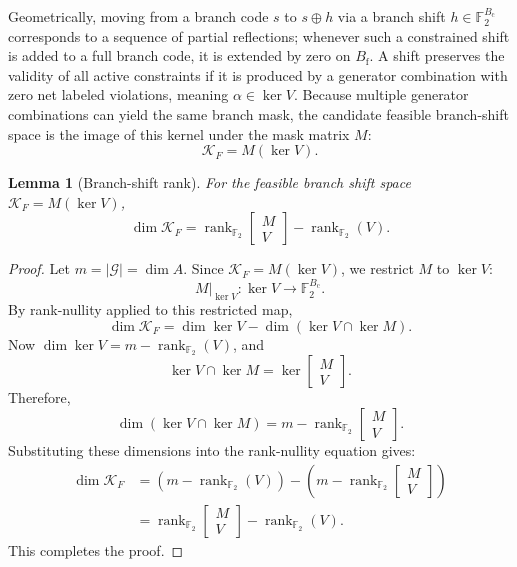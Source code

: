 \documentclass[11pt]{article}
\theoremstyle{plain}
\newtheorem{lemma}{Lemma}
\theoremstyle{definition}
\begin{document}
Geometrically, moving from a branch code $s$ to $s \oplus h$ via a branch shift $h \in \mathbb{F}_2^{B_{\mathrm{c}}}$ corresponds to a sequence of partial reflections; whenever such a constrained shift is added to a full branch code, it is extended by zero on $B_{\mathrm{f}}$. A shift preserves the validity of all active constraints if it is produced by a generator combination with zero net labeled violations, meaning $\alpha \in \ker V$. Because multiple generator combinations can yield the same branch mask, the candidate feasible branch-shift space is the image of this kernel under the mask matrix $M$:
\[
\mathcal{K}_F = M(\ker V).
\]

\begin{lemma}[Branch-shift rank]
\label{lem:rank}
For the feasible branch shift space $\mathcal{K}_F = M(\ker V)$,
\[
\dim \mathcal{K}_F
=
\operatorname{rank}_{\mathbb{F}_2}\begin{bmatrix} M \\ V \end{bmatrix}
-
\operatorname{rank}_{\mathbb{F}_2}(V).
\]
\end{lemma}

\begin{proof}
Let $m = \lvert \mathcal{G} \rvert = \dim A$. Since $\mathcal{K}_F = M(\ker V)$, we restrict $M$ to $\ker V$:
\[
M\big|_{\ker V} : \ker V \to \mathbb{F}_2^{B_{\mathrm{c}}}.
\]
By rank-nullity applied to this restricted map,
\[
\dim \mathcal{K}_F
=
\dim \ker V
-
\dim(\ker V \cap \ker M).
\]
Now $\dim \ker V = m - \operatorname{rank}_{\mathbb{F}_2}(V)$, and
\[
\ker V \cap \ker M
=
\ker\begin{bmatrix} M \\ V \end{bmatrix}.
\]
Therefore,
\[
\dim(\ker V \cap \ker M)
=
m - \operatorname{rank}_{\mathbb{F}_2}\begin{bmatrix} M \\ V \end{bmatrix}.
\]
Substituting these dimensions into the rank-nullity equation gives:
\[
\begin{aligned}
\dim \mathcal{K}_F &= (m - \operatorname{rank}_{\mathbb{F}_2}(V)) - \left(m - \operatorname{rank}_{\mathbb{F}_2}\begin{bmatrix} M \\ V \end{bmatrix}\right) \\
&= \operatorname{rank}_{\mathbb{F}_2}\begin{bmatrix} M \\ V \end{bmatrix} - \operatorname{rank}_{\mathbb{F}_2}(V).
\end{aligned}
\]
This completes the proof.
\end{proof}
\end{document}

